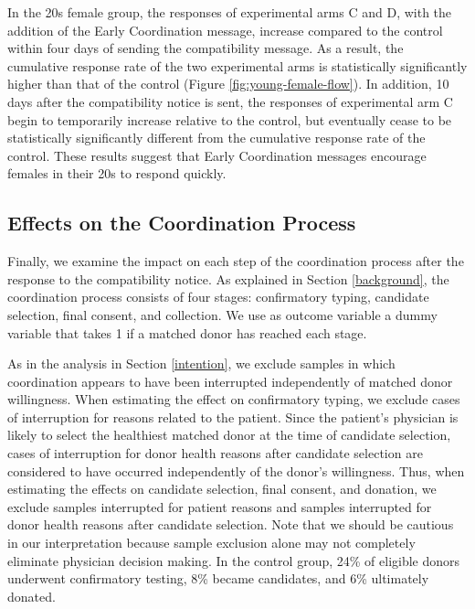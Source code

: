 \documentclass[
]{article}
\begin{document}
In the 20s female group, the responses of experimental arms C and D, with the addition of the Early Coordination message, increase compared to the control within four days of sending the compatibility message. As a result, the cumulative response rate of the two experimental arms is statistically significantly higher than that of the control (Figure \ref{fig:young-female-flow}). In addition, 10 days after the compatibility notice is sent, the responses of experimental arm C begin to temporarily increase relative to the control, but eventually cease to be statistically significantly different from the cumulative response rate of the control. These results suggest that Early Coordination messages encourage females in their 20s to respond quickly.

\hypertarget{process}{%
\subsection{Effects on the Coordination Process}\label{process}}

Finally, we examine the impact on each step of the coordination process after the response to the compatibility notice. As explained in Section \ref{background}, the coordination process consists of four stages: confirmatory typing, candidate selection, final consent, and collection. We use as outcome variable a dummy variable that takes 1 if a matched donor has reached each stage.

As in the analysis in Section \ref{intention}, we exclude samples in which coordination appears to have been interrupted independently of matched donor willingness. When estimating the effect on confirmatory typing, we exclude cases of interruption for reasons related to the patient. Since the patient's physician is likely to select the healthiest matched donor at the time of candidate selection, cases of interruption for donor health reasons after candidate selection are considered to have occurred independently of the donor's willingness. Thus, when estimating the effects on candidate selection, final consent, and donation, we exclude samples interrupted for patient reasons and samples interrupted for donor health reasons after candidate selection. Note that we should be cautious in our interpretation because sample exclusion alone may not completely eliminate physician decision making. In the control group, 24\% of eligible donors underwent confirmatory testing, 8\% became candidates, and 6\% ultimately donated.
\end{document}
